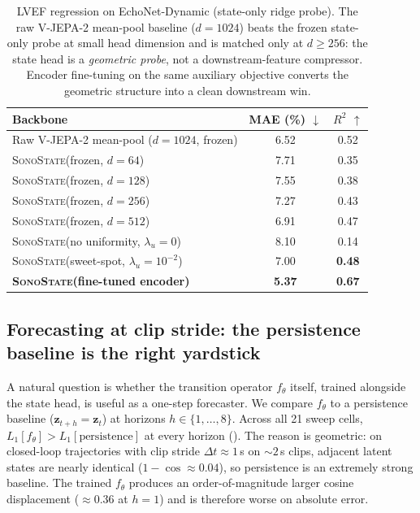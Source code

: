\documentclass[runningheads]{llncs}
\newcommand{\sonostate}{\textsc{SonoState}\xspace}
\begin{document}
\begin{table}[t]
\centering
\caption{LVEF regression on EchoNet-Dynamic (state-only ridge probe). The
raw V-JEPA-2 mean-pool baseline ($d{=}1024$) beats the frozen state-only
probe at small head dimension and is matched only at $d\!\geq\!256$:
the state head is a \emph{geometric probe}, not a downstream-feature
compressor. Encoder fine-tuning on the same auxiliary objective converts
the geometric structure into a clean downstream win.}
\label{tab:lvef}
\begin{tabular}{lcc}
\toprule
Backbone & MAE (\%) $\downarrow$ & $R^2$ $\uparrow$ \\
\midrule
Raw V-JEPA-2 mean-pool ($d{=}1024$, frozen) & 6.52 & 0.52 \\
\midrule
\sonostate (frozen, $d{=}64$)              & 7.71 & 0.35 \\
\sonostate (frozen, $d{=}128$)             & 7.55 & 0.38 \\
\sonostate (frozen, $d{=}256$)             & 7.27 & 0.43 \\
\sonostate (frozen, $d{=}512$)             & 6.91 & 0.47 \\
\sonostate (no uniformity, $\lambda_u{=}0$)& 8.10 & 0.14 \\
\sonostate (sweet-spot, $\lambda_u{=}10^{-2}$) & 7.00 & \textbf{0.48} \\
\midrule
\textbf{\sonostate (fine-tuned encoder)}   & \textbf{5.37} & \textbf{0.67} \\
\bottomrule
\end{tabular}
\end{table}

\subsection{Forecasting at clip stride: the persistence baseline is the
right yardstick}
\label{sec:forecast}

A natural question is whether the transition operator $f_\theta$ itself,
trained alongside the state head, is useful as a one-step forecaster.
We compare $f_\theta$ to a persistence baseline
($\hat{\mathbf{z}}_{t+h} = \mathbf{z}_t$) at horizons $h\in\{1,\ldots,8\}$.
Across all 21 sweep cells, $L_1[f_\theta] > L_1[\text{persistence}]$ at every
horizon (). The reason is geometric: on closed-loop
trajectories with clip stride $\Delta t\!\approx\!1$\,s on $\sim\!2$\,s
clips, adjacent latent states are nearly identical
($1\!-\!\cos\!\approx\!0.04$), so persistence is an extremely strong
baseline. The trained $f_\theta$ produces an order-of-magnitude larger
cosine displacement ($\approx 0.36$ at $h{=}1$) and is therefore worse on
absolute error.
\end{document}

